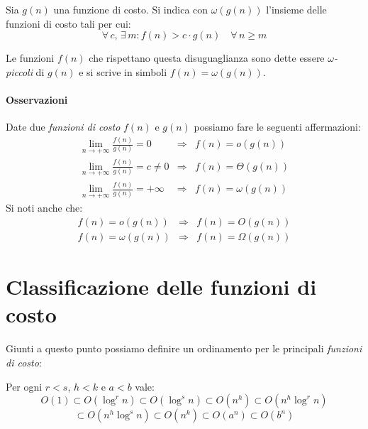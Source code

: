 \begin{definition}
    Sia $g(n)$ una funzione di costo. Si indica con $\omega(g(n))$ l'insieme
    delle funzioni di costo tali per cui:
    \[\forall\,c,\,\exists\,m:f(n)>c\cdot g(n)\quad\forall\,n\geq m\]
\end{definition}\noindent
Le funzioni $f(n)$ che rispettano questa disuguaglianza sono dette essere
\emph{$\omega$-piccoli} di $g(n)$ e si scrive in simboli $f(n)=\omega(g(n))$.

\paragraph{Osservazioni}
Date due \emph{funzioni di costo} $f(n)$ e $g(n)$ possiamo fare le seguenti
affermazioni:
\[\renewcommand{\arraystretch}{1.3} 
\begin{array}{rcl}
    \lim\limits_{n\to+\infty}\frac{f(n)}{g(n)}=0 & \Rightarrow & f(n)=o(g(n))\\
    \lim\limits_{n\to+\infty}\frac{f(n)}{g(n)}=c\neq0 & \Rightarrow & f(n)=\Theta(g(n))\\
    \lim\limits_{n\to+\infty}\frac{f(n)}{g(n)}=+\infty & \Rightarrow & f(n)=\omega(g(n))
\end{array}\]
Si noti anche che:
\[\begin{array}{rcl}
    f(n)=o(g(n)) & \Rightarrow & f(n)=O(g(n))\\
    f(n)=\omega(g(n)) & \Rightarrow & f(n)=\Omega(g(n))
\end{array}\]

\section{Classificazione delle funzioni di costo}
Giunti a questo punto possiamo definire un ordinamento per le principali
\emph{funzioni di costo}:

\begin{definition}
    Per ogni $r<s$, $h<k$ e $a<b$ vale:
    \[O(1)\subset O(\log^rn)\subset O(\log^sn)\subset O(n^h)\subset
    O(n^h\log^rn)\]
    \[\subset O(n^h\log^sn)\subset O(n^k)\subset O(a^n)\subset O(b^n)\]
\end{definition}